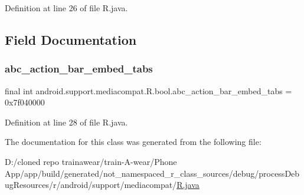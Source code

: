 Definition at line 26 of file R.\+java.


\begin{DoxyCode}{0}

\end{DoxyCode}


\subsection{Field Documentation}
\mbox{\label{classandroid_1_1support_1_1mediacompat_1_1_r_1_1bool_abb24c449546205df61a1fd3372dcaae9}} 
\subsubsection{\texorpdfstring{abc\_action\_bar\_embed\_tabs}{abc\_action\_bar\_embed\_tabs}}
{\footnotesize\ttfamily final int android.\+support.\+mediacompat.\+R.\+bool.\+abc\+\_\+action\+\_\+bar\+\_\+embed\+\_\+tabs = 0x7f040000\hspace{0.3cm}{\ttfamily [static]}}



Definition at line 28 of file R.\+java.



The documentation for this class was generated from the following file\+:\begin{DoxyCompactItemize}
\item 
D\+:/cloned repo trainawear/train-\/\+A-\/wear/\+Phone App/app/build/generated/not\+\_\+namespaced\+\_\+r\+\_\+class\+\_\+sources/debug/process\+Debug\+Resources/r/android/support/mediacompat/\mbox{\hyperlink{process_debug_resources_2r_2android_2support_2mediacompat_2_r_8java}{R.\+java}}\end{DoxyCompactItemize}
